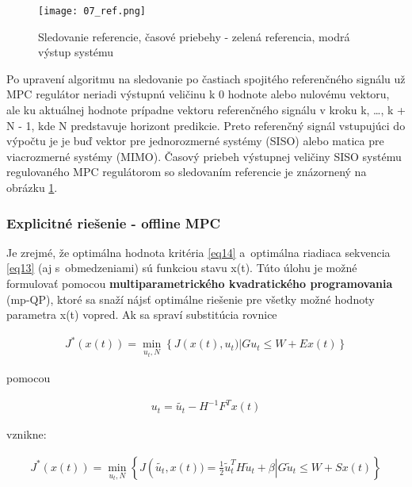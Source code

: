 \begin{figure}[!htbp]
\centering
\texttt{[image: 07\_ref.png]}
\caption{Sledovanie referencie,  časové priebehy -  zelená referencia, modrá výstup systému}
\label{07_ref}
\end{figure}

Po upravení algoritmu na sledovanie po častiach spojitého referenčného signálu už MPC regulátor neriadi výstupnú veličinu k 0 hodnote alebo nulovému vektoru, ale ku aktuálnej hodnote prípadne vektoru referenčného signálu v kroku k, \dots, k + N - 1, kde N predstavuje horizont predikcie. Preto referenčný signál vstupujúci do výpočtu je je buď vektor pre jednorozmerné systémy (SISO) alebo matica pre viacrozmerné systémy (MIMO). Časový priebeh výstupnej veličiny SISO systému regulovaného MPC regulátorom so sledovaním referencie je znázornený na obrázku \ref{07_ref}.

\subsubsection{Explicitné riešenie - offline MPC} \label{offmpc}

Je zrejmé, že optimálna hodnota kritéria \ref{eq14} a~optimálna riadiaca sekvencia \ref{eq13} (aj s~obmedzeniami) sú funkciou stavu x(t). Túto úlohu je možné formulovať pomocou \textbf{multiparametrického kvadratického
programovania} (mp-QP), ktoré sa snaží nájsť optimálne riešenie pre
všetky možné hodnoty parametra x(t) vopred. Ak sa spraví substitúcia
rovnice

\begin{equation} \label{eq31}
\begin{split}
J^{*}\left( x\left( t \right) \right) = \min_{u_t,N}\left\{ J\left( x\left( t \right),u_{t}) \right|Gu_{t} \leq W + Ex(t) \right\}
\end{split}
\end{equation}

pomocou

\begin{equation} \label{eq32}
\begin{split}
u_{t} = \tilde{u_{t}} - H^{- 1}F^{T}x(t)
\end{split}
\end{equation}

vznikne:

\begin{equation} \label{eq33}
\begin{split}
J^{*}\left( x\left( t \right) \right) = \min_{u_t,N}\left\{ J\left( \tilde{u_{t}},x\left( t \right)) = \frac{1}{2}{\tilde{u}}_{t}^{T}H{\tilde{u}}_{t} + \beta \right|G{\tilde{u}}_{t} \leq W + Sx(t) \right\}
\end{split}
\end{equation}

